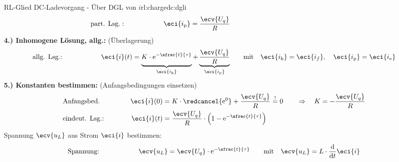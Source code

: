 \begin{frame}[t]
{\begin{bsp}{RL-Glied DC-Ladevorgang - Über DGL von $i$}{rl:chargedc:dgli}
\begin{align*}
        &\text{part. Lsg.}:&&&
            \eci{i_{\mathrm p}} &= \frac{\ecv{U_q}}{R}
        \\[-15pt]&\hphantom{R1oooooooooo}&&&\hphantom{L3ooooooooooo}&\hphantom{R3ooooooooooooooo}&&&&\hphantom{R5oooooooooooooooooo}\nonumber%
    \end{align*}%
    \textbf{4.) Inhomogene Lösung, allg.:} (Überlagerung)%
    \begin{align*}%
        &\text{allg. Lsg.:}&&&
            \eci{i}(t) &=
            \underbrace{%
                K \cdot \mathrm{e}^{-\sfrac{t}{\tau}} \vphantom{\frac{\ecv{U_q}}{R}}%
            }_{\eci{i_{\mathrm h}}}
            +
            \underbrace{
                \frac{\ecv{U_q}}{R}
            }_{\eci{i_{\mathrm p}}} &&&
            &\text{mit}\quad \eci{i_{\mathrm h}}=\eci{i_f},\quad \eci{i_{\mathrm p}}=\eci{i_e}
        \\[-15pt]&\hphantom{R1oooooooooo}&&&\hphantom{L3ooooooooooo}&\hphantom{R3ooooooooooooooo}&&&&\hphantom{R5oooooooooooooooooo}\nonumber%
        \end{align*}%
    \textbf{5.) Konstanten bestimmen:} (Anfangsbedingungen einsetzen)%
    \begin{align*}%
        &\text{Anfangsbed.}&&&
            \eci{i}(0) &= K \cdot \redcancel{\mathrm{e}^0} + \frac{\ecv{U_q}}{R} \overset{!}{=} 0 &&&
            &\Rightarrow\quad K = -\frac{\ecv{U_q}}{R}\\
        &\text{eindeut. Lsg.:}&&&
            \eci{i}(t) &= \frac{\ecv{U_q}}{R} \cdot \left( 1 - \mathrm{e}^{-\sfrac{t}{\tau}} \right)
        \\[-15pt]&\hphantom{R1oooooooooo}&&&\hphantom{L3ooooooooooo}&\hphantom{R3ooooooooooooooo}&&&&\hphantom{R5oooooooooooooooooo}\nonumber%
    \end{align*}%
    Spannung $\ecv{u_L}$ aus Strom $\eci{i}$ bestimmen:%
    \begin{align*}%
        &\text{Spannung:}&&&
            \ecv{u_L} &= \ecv{U_q} \cdot \mathrm{e}^{-\sfrac{t}{\tau}} &&&
            &\text{mit}\quad \ecv{u_L} = L \cdot \frac{\mathrm{d}}{\mathrm{d}t} \eci{i}
        \\[-15pt]&\hphantom{R1oooooooooo}&&&\hphantom{L3ooooooooooo}&\hphantom{R3ooooooooooooooo}&&&&\hphantom{R5oooooooooooooooooo}\nonumber%
    \end{align*}
    \endgroup
\end{bsp}
}%


\end{frame}
